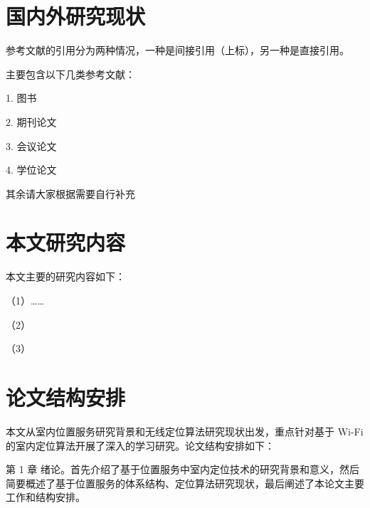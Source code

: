 \section{国内外研究现状}

参考文献的引用分为两种情况，一种是间接引用（上标）\cite{2004-David-Order}，另一种是直接引用。


主要包含以下几类参考文献：

1. 图书

2. 期刊论文

3. 会议论文

4. 学位论文

其余请大家根据需要自行补充


\section{本文研究内容}

本文主要的研究内容如下：

（1）……

（2）

（3）


\section{论文结构安排}

本文从室内位置服务研究背景和无线定位算法研究现状出发，重点针对基于 Wi-Fi 的室内定位算法开展了深入的学习研究。论文结构安排如下：

第 1 章 绪论。首先介绍了基于位置服务中室内定位技术的研究背景和意义，然后简要概述了基于位置服务的体系结构、定位算法研究现状，最后阐述了本论文主要工作和结构安排。




